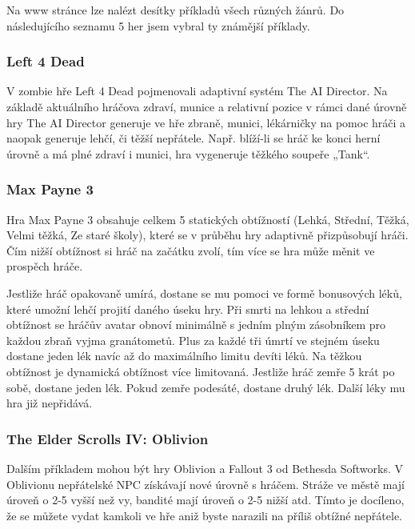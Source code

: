 Na www stránce \cite{1} lze nalézt desítky příkladů všech různých žánrů. Do následujícího seznamu 5 her jsem vybral ty známější příklady.

\subsubsection{Left 4 Dead}
\label{sec:Left4Dead}

V zombie hře Left 4 Dead pojmenovali adaptivní systém The AI Director. Na základě aktuálního hráčova zdraví, munice a relativní pozice v rámci dané úrovně hry The AI Director generuje ve hře zbraně, munici, lékárničky na pomoc hráči a naopak generuje lehčí, či těžší nepřátele. Např. blíží-li se hráč ke konci herní úrovně a má plné zdraví i munici, hra vygeneruje těžkého soupeře „Tank“\cite{2}. 

\subsubsection{Max Payne 3}

Hra Max Payne 3 obsahuje celkem 5 statických obtížností (Lehká, Střední, Těžká, Velmi těžká, Ze staré školy), které se v průběhu hry adaptivně přizpůsobují hráči. Čím nižší obtížnost si hráč na začátku zvolí, tím více se hra může měnit ve prospěch hráče.

Jestliže hráč opakovaně umírá, dostane se mu pomoci ve formě bonusových léků, které umožní lehčí projití daného úseku hry. Při smrti na lehkou a střední obtížnost se hráčův avatar obnoví minimálně s jedním plným zásobníkem pro každou zbraň vyjma granátometů. Plus za každé tři úmrtí ve stejném úseku dostane jeden lék navíc až do maximálního limitu devíti léků.
Na těžkou obtížnost je dynamická obtížnost více limitovaná. Jestliže hráč zemře 5 krát po sobě, dostane jeden lék. Pokud zemře podesáté, dostane druhý lék. Další léky mu hra již nepřidává\cite{3}. 

\subsubsection{The Elder Scrolls IV: Oblivion}

Dalším příkladem mohou být hry Oblivion a Fallout 3 od Bethesda Softworks. V Oblivionu nepřátelské NPC získávají nové úrovně s hráčem. Stráže ve městě mají úroveň o 2-5 vyšší než vy, bandité mají úroveň o 2-5 nižší atd. Tímto je docíleno, že se můžete vydat kamkoli ve hře aniž byste narazili na příliš obtížné nepřátele. 

